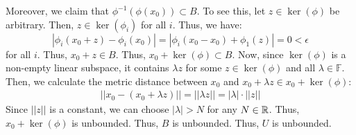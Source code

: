 \documentclass[12pt]{article}
\begin{document}
\begin{solution}
    Moreover, we claim that $\phi^{-1}(\phi(x_0)) \subset B$. To see this, let $z \in \ker(\phi)$ be arbitrary. Then, $z \in \ker(\phi_i)$ for all $i$. Thus, we have: 
    \[ |\phi_i(x_0+z)-\phi_i(x_0)| = |\phi_i(x_0-x_0)+\phi_1(z)| = 0 < \epsilon \]
    for all $i$. Thus, $x_0 + z \in B$. Thus, $x_0 + \ker(\phi) \subset B$. \bbni
    Now, since $\ker(\phi)$ is a non-empty linear subspace, it contains $\lambda z$ for some $z \in \ker(\phi)$ and all $\lambda \in \mathbb F$. Then, we calculate the metric distance between $x_0$ and $x_0 + \lambda z \in x_0+\ker(\phi)$:
    \begin{align*}
        ||x_0 - (x_0 + \lambda z)|| = ||\lambda z|| = |\lambda| \cdot ||z||
    \end{align*}
    Since $||z||$ is a constant, we can choose $|\lambda| > N$ for any $N \in \mathbb R$. Thus, $x_0 + \ker(\phi)$ is unbounded. Thus, $B$ is unbounded. Thus, $U$ is unbounded. \bbni
\end{solution}
\newpage
\end{document}
